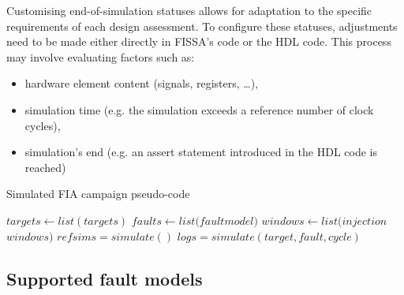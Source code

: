 Customising end-of-simulation statuses allows for adaptation to the specific requirements of each design assessment. To configure these statuses, adjustments need to be made either directly in FISSA's code or the HDL code. This process may involve evaluating factors such as:
\begin{itemize}
    \item hardware element content (signals, registers, \ldots),
    \item simulation time (e.g. the simulation exceeds a reference number of clock cycles),
    \item simulation's end (e.g. an assert statement introduced in the HDL code is reached)
\end{itemize}

\begin{algorithm}
    \caption{Simulated FIA campaign pseudo-code}
    \label{algo:pseudoCodeSimuStages}
    \normalsize
    \begin{algorithmic}[1]
        \Require $targets \leftarrow list(targets)$
        \Require $faults \leftarrow list(fault$\textunderscore$model)$
        \Require $windows \leftarrow list(injection$\textunderscore$windows)$
            \State $ref$\textunderscore$sims = simulate()$
                        \State $logs = simulate(target, fault, cycle)$
                    \EndFor
                \EndFor
            \EndFor
    \end{algorithmic}
\end{algorithm}

\subsection{Supported fault models}
\label{subsec:supported_fault_models}

